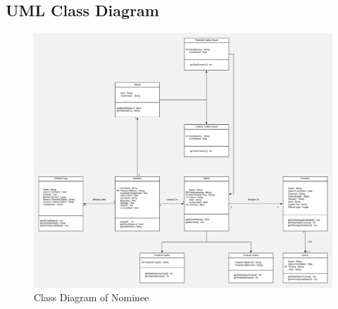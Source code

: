 \documentclass[12pt, a4paper, titlepage]{article}
\begin{document}
\subsection{UML Class Diagram}
\begin{center}
\begin{figure}[ht]
	\includegraphics[scale=0.45]{Class_Diagram_for_Election_Portal_1.png}
	\caption{Class Diagram of Nominee}
\end{figure}
\end{center}
\end{document}
